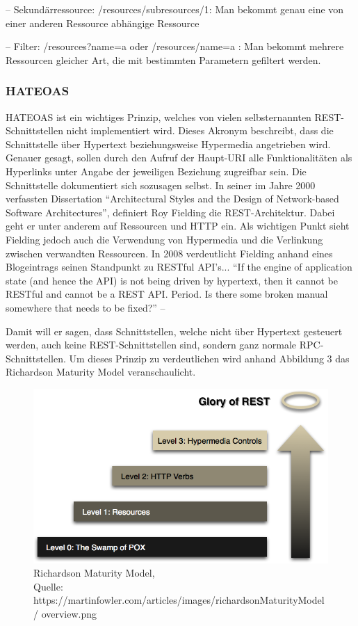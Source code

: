 –	Sekundärressource: /resources/subresources/1:	Man bekommt genau eine von einer anderen Ressource abhängige Ressource

–	Filter: /resources?name=a oder /resources/name=a : Man bekommt mehrere Ressourcen gleicher Art, die mit bestimmten Parametern gefiltert werden.

\subsubsection{HATEOAS}
\label{sec:RESTHATEOAS}

HATEOAS ist ein wichtiges Prinzip, welches von vielen selbsternannten \ac{REST}-Schnittstellen
nicht implementiert wird. Dieses Akronym beschreibt, dass die Schnittstelle über Hypertext
beziehungsweise Hypermedia angetrieben wird. Genauer gesagt, sollen durch den Aufruf
der Haupt-\ac{URI} alle Funktionalitäten als Hyperlinks unter Angabe der jeweiligen Beziehung
zugreifbar sein. Die Schnittstelle dokumentiert sich sozusagen selbst.
In seiner im Jahre 2000 verfassten Dissertation “Architectural Styles and the Design of
Network-based Software Architectures”, definiert Roy Fielding die \ac{REST}-Architektur. Dabei
geht er unter anderem auf Ressourcen und \ac{HTTP} ein. Als wichtigen Punkt sieht Fielding
jedoch auch die Verwendung von Hypermedia und die Verlinkung zwischen verwandten Ressourcen.
In 2008 verdeutlicht Fielding anhand eines Blogeintrags seinen Standpunkt zu \ac{REST}ful API’s...
“If the engine of application state (and hence the API) is not being driven by hypertext, then
it cannot be RESTful and cannot be a REST API. Period. Is there some broken manual
somewhere that needs to be fixed?” – \cite{.19.03.2017}

Damit will er sagen, dass Schnittstellen, welche nicht über Hypertext gesteuert werden, auch
keine \ac{REST}-Schnittstellen sind, sondern ganz normale \ac{RPC}-Schnittstellen.
Um dieses Prinzip zu verdeutlichen wird anhand Abbildung 3 das Richardson Maturity Model
veranschaulicht.
 
\begin{figure}[!htb]
	\centering
	\includegraphics[scale=0.5]{hateoas.png}
	\caption[Richardson Maturity Model]{Richardson Maturity Model,\\ Quelle: https://martinfowler.com/articles/images/richardsonMaturityModel/ overview.png}
\end{figure}
 


